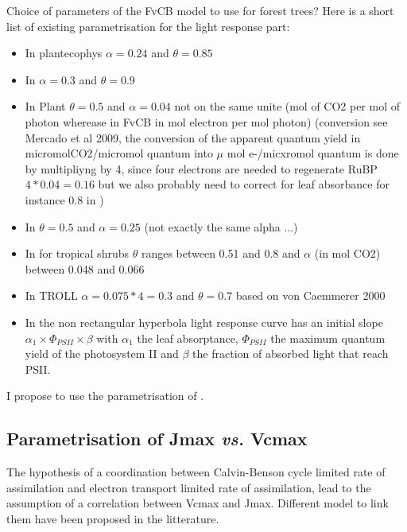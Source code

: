 \documentclass[a4paper,11pt]{article}
\begin{document}
Choice of parameters of the FvCB model to use for
forest trees? Here is a short list of existing parametrisation for the
light response part:
\begin{itemize}

\item In plantecophys \citep{Duursma-2015}  $\alpha = 0.24$ and $\theta = 0.85$

\item In \citet{Medlyn-2002} $\alpha = 0.3$ and $\theta = 0.9$

\item In Plant $\theta = 0.5$ and $\alpha= 0.04$ not on the same unite
  (mol of CO2 per mol of photon wherease in FvCB in mol electron per
  mol photon)  (conversion see Mercado et al 2009, the conversion of
  the apparent quantum yield in micromolCO2/micromol quantum into
  $\mu$ mol e-/micxromol quantum is done by multipliyng by 4, since
  four electrons are needed to regenerate RuBP $4*0.04 = 0.16$ but we
  also probably need to correct for leaf absorbance for instance 0.8 in \citet{Medlyn-2002})

\item In \citet{Sterck-2011} $\theta = 0.5$ and $\alpha = 0.25$ (not exactly the same alpha ...)

\item  In \citet{Valladares-1997} for tropical shrubs $\theta$ ranges between 0.51 and 0.8 and $\alpha$ (in mol CO2) between 0.048 and 0.066

\item In TROLL \citet{Marechaux-2017} $\alpha = 0.075*4 = 0.3$ and $\theta = 0.7$ based on von Caemmerer 2000

\item In \citet{vonCaemmerer-2000} the non rectangular hyperbola light response curve has an initial slope $\alpha_1 \times \Phi_{PSII} \times \beta$ with $\alpha_1$ the leaf absorptance, $\Phi_{PSII}$ the maximum quantum yield of the photosystem II and $\beta$ the fraction of absorbed light that reach PSII.

\end{itemize}

I propose to use the parametrisation of \citet{Marechaux-2017}.


\subsection{Parametrisation of Jmax \textit{vs.} Vcmax}

The hypothesis of a coordination between Calvin-Benson cycle limited
rate of assimilation and electron transport limited rate of
assimilation, lead to the assumption of a correlation between Vcmax and
Jmax. Different model to link them have been proposed in the
litterature.
\end{document}
